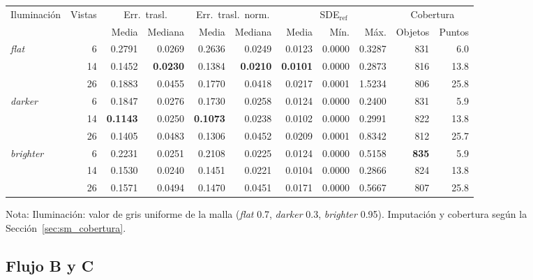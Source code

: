 \begin{table}[H]
\begin{tabular*}{\textwidth}{@{\extracolsep{\fill}}lrrrrrrrrrr@{}}
\toprule
\multirow{2}{*}{Iluminación} & \multirow{2}{*}{Vistas} & \multicolumn{2}{c}{Err.\ trasl.} & \multicolumn{2}{c}{Err.\ trasl.\ norm.} & \multicolumn{3}{c}{SDE$_{\mathrm{ref}}$} & \multicolumn{2}{c}{Cobertura} \\
\cmidrule(lr){3-4} \cmidrule(lr){5-6} \cmidrule(lr){7-9} \cmidrule(lr){10-11}
 &  & Media & Mediana & Media & Mediana & Media & Mín. & Máx. & Objetos & Puntos \\
\midrule
\multirow{3}{*}{\textit{flat}} & 6 & 0.2791 & 0.0269 & 0.2636 & 0.0249 & 0.0123 & 0.0000 & 0.3287 & 831 & 6.0 \\
 & 14 & 0.1452 & \textbf{0.0230} & 0.1384 & \textbf{0.0210} & \textbf{0.0101} & 0.0000 & 0.2873 & 816 & 13.8 \\
 & 26 & 0.1883 & 0.0455 & 0.1770 & 0.0418 & 0.0217 & 0.0001 & 1.5234 & 806 & 25.8 \\
\midrule
\multirow{3}{*}{\textit{darker}} & 6 & 0.1847 & 0.0276 & 0.1730 & 0.0258 & 0.0124 & 0.0000 & 0.2400 & 831 & 5.9 \\
 & 14 & \textbf{0.1143} & 0.0250 & \textbf{0.1073} & 0.0238 & 0.0102 & 0.0000 & 0.2991 & 822 & 13.8 \\
 & 26 & 0.1405 & 0.0483 & 0.1306 & 0.0452 & 0.0209 & 0.0001 & 0.8342 & 812 & 25.7 \\
\midrule
\multirow{3}{*}{\textit{brighter}} & 6 & 0.2231 & 0.0251 & 0.2108 & 0.0225 & 0.0124 & 0.0000 & 0.5158 & \textbf{835} & 5.9 \\
 & 14 & 0.1530 & 0.0240 & 0.1451 & 0.0221 & 0.0104 & 0.0000 & 0.2866 & 824 & 13.8 \\
 & 26 & 0.1571 & 0.0494 & 0.1470 & 0.0451 & 0.0171 & 0.0000 & 0.5667 & 807 & 25.8 \\
\bottomrule
\end{tabular*}

\vspace{1.5ex}
\begin{minipage}{\textwidth}
Nota: Iluminación: valor de gris uniforme de la malla (\textit{flat} 0.7, \textit{darker} 0.3, \textit{brighter} 0.95). Imputación y cobertura según la Sección~\ref{sec:sm_cobertura}.
\end{minipage}
\end{table}

\clearpage


\newpage    
\subsection{Flujo B y C}


